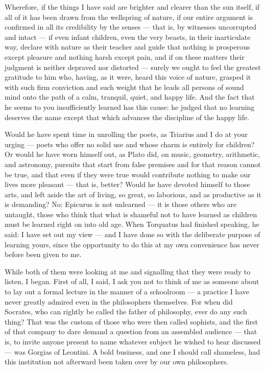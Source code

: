  Wherefore, if the things I have said are brighter and clearer than the sun itself, if all of it has been drawn from the wellspring of nature, if our entire argument is confirmed in all its credibility by the senses — that is, by witnesses uncorrupted and intact — if even infant children, even the very beasts, in their inarticulate way, declare with nature as their teacher and guide that nothing is prosperous except pleasure and nothing harsh except pain, and if on these matters their judgment is neither depraved nor distorted — surely we ought to feel the greatest gratitude to him who, having, as it were, heard this voice of nature, grasped it with such firm conviction and such weight that he leads all persons of sound mind onto the path of a calm, tranquil, quiet, and happy life. And the fact that he seems to you insufficiently learned has this cause: he judged that no learning deserves the name except that which advances the discipline of the happy life.

 Would he have spent time in unrolling the poets, as Triarius and I do at your urging — poets who offer no solid use and whose charm is entirely for children? Or would he have worn himself out, as Plato did, on music, geometry, arithmetic, and astronomy, pursuits that start from false premises and for that reason cannot be true, and that even if they were true would contribute nothing to make our lives more pleasant — that is, better? Would he have devoted himself to those arts, and left aside the art of living, so great, so laborious, and as productive as it is demanding? No: Epicurus is not unlearned — it is those others who are untaught, those who think that what is shameful not to have learned as children must be learned right on into old age. When Torquatus had finished speaking, he said: I have set out my view — and I have done so with the deliberate purpose of learning yours, since the opportunity to do this at my own convenience has never before been given to me.



 While both of them were looking at me and signalling that they were ready to listen, I began. First of all, I said, I ask you not to think of me as someone about to lay out a formal lecture in the manner of a schoolroom — a practice I have never greatly admired even in the philosophers themselves. For when did Socrates, who can rightly be called the father of philosophy, ever do any such thing? That was the custom of those who were then called sophists, and the first of that company to dare demand a question from an assembled audience — that is, to invite anyone present to name whatever subject he wished to hear discussed — was Gorgias of Leontini. A bold business, and one I should call shameless, had this institution not afterward been taken over by our own philosophers.

